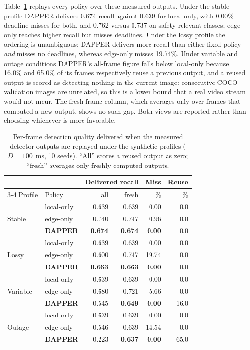 \documentclass[conference,a4paper]{IEEEtran}
\begin{document}
Table~\ref{tab:replay} replays every policy over these measured outputs. Under the stable profile DAPPER delivers 0.674 recall against 0.639 for local-only, with 0.00\% deadline misses for both, and 0.762 versus 0.737 on safety-relevant classes; edge-only reaches higher recall but misses deadlines. Under the lossy profile the ordering is unambiguous: DAPPER delivers more recall than either fixed policy \emph{and} misses no deadlines, whereas edge-only misses 19.74\%. Under variable and outage conditions DAPPER's all-frame figure falls below local-only because 16.0\% and 65.0\% of its frames respectively reuse a previous output, and a reused output is scored as detecting nothing in the current image: consecutive COCO validation images are unrelated, so this is a lower bound that a real video stream would not incur. The fresh-frame column, which averages only over frames that computed a new output, shows no such gap. Both views are reported rather than choosing whichever is more favorable.

\begin{table}[t]
\centering
\caption{Per-frame detection quality delivered when the measured detector outputs are replayed under the synthetic profiles ($D=100$~ms, 10 seeds). ``All'' scores a reused output as zero; ``fresh'' averages only freshly computed outputs.}
\label{tab:replay}
\scriptsize
\renewcommand{\arraystretch}{0.88}
\setlength{\tabcolsep}{3.6pt}
\begin{tabular}{@{}llrrrr@{}}
\toprule
& & \multicolumn{2}{c}{Delivered recall} & Miss & Reuse \\
\cmidrule(lr){3-4}
Profile & Policy & all & fresh & \% & \% \\
\midrule
\multirow{3}{*}{Stable}
& local-only & 0.639 & 0.639 & 0.00 & 0.0 \\
& edge-only & 0.740 & 0.747 & 0.96 & 0.0 \\
& \textbf{DAPPER} & \textbf{0.674} & \textbf{0.674} & \textbf{0.00} & 0.0 \\
\midrule
\multirow{3}{*}{Lossy}
& local-only & 0.639 & 0.639 & 0.00 & 0.0 \\
& edge-only & 0.600 & 0.747 & 19.74 & 0.0 \\
& \textbf{DAPPER} & \textbf{0.663} & \textbf{0.663} & \textbf{0.00} & 0.0 \\
\midrule
\multirow{3}{*}{Variable}
& local-only & 0.639 & 0.639 & 0.00 & 0.0 \\
& edge-only & 0.680 & 0.721 & 5.66 & 0.0 \\
& \textbf{DAPPER} & 0.545 & \textbf{0.649} & \textbf{0.00} & 16.0 \\
\midrule
\multirow{3}{*}{Outage}
& local-only & 0.639 & 0.639 & 0.00 & 0.0 \\
& edge-only & 0.546 & 0.639 & 14.54 & 0.0 \\
& \textbf{DAPPER} & 0.223 & \textbf{0.637} & \textbf{0.00} & 65.0 \\
\bottomrule
\end{tabular}
\end{table}
\end{document}
